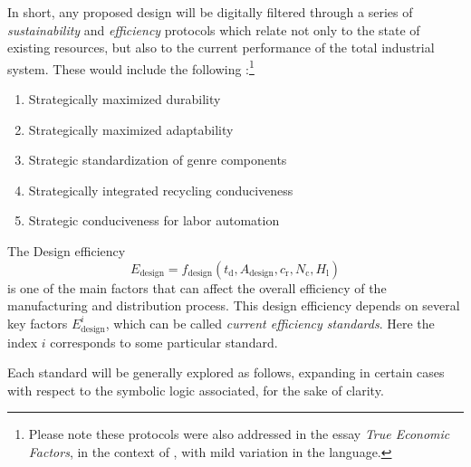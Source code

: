 \documentclass[10pt, a4paper, cleardoubleempty, openright, twoside]{book}
\begin{document}
In short, any proposed design will be digitally filtered through a
series of \emph{sustainability} and \emph{efficiency} protocols which
relate not only to the state of existing resources, but also to the
current performance of the total industrial system.  These would include
the following :\footnote{
	Please note these protocols were also addressed in the essay
	\emph{True Economic Factors}, in the context of
	, with mild variation in the
	language.
}
\begin{enumerate}
\item Strategically maximized durability
\item Strategically maximized adaptability
\item Strategic standardization of genre components
\item Strategically integrated recycling conduciveness
\item Strategic conduciveness for labor automation
\end{enumerate}
The Design efficiency 
\begin{equation}
	E_\text{design} = f_\text{design}(t_\text{d}, A_\text{design},
	c_\text{r}, N_\text{c}, H_\text{l})
	\label{eq:designEfficiency}
\end{equation}
is one of the main factors that can affect the overall efficiency of the
manufacturing and distribution process. This design efficiency depends
on several key factors $E^i_\text{design}$, which can be called \emph{current efficiency standards}. Here the index $i$ corresponds to some
particular standard.

Each standard will be generally explored as follows, expanding in
certain cases with respect to the symbolic logic associated, for the
sake of clarity. 
\end{document}
